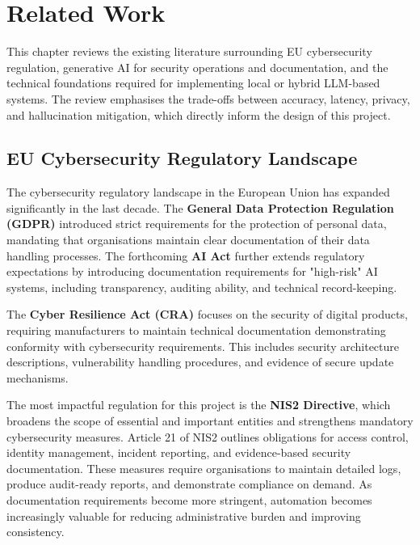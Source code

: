\documentclass[]{UCD_CS_FYP_Report}
\begin{document}
\chapter{Related Work}
\label{chp:related_work}
    This chapter reviews the existing literature surrounding EU cybersecurity regulation, generative AI for security operations and documentation, and the technical foundations required for implementing local or hybrid LLM-based systems. The review emphasises the trade-offs between accuracy, latency, privacy, and hallucination mitigation, which directly inform the design of this project.

\section{EU Cybersecurity Regulatory Landscape}
\label{sec:eu_regulatory_landscape}
        The cybersecurity regulatory landscape in the European Union has expanded significantly in the last decade. The \textbf{General Data Protection Regulation (GDPR)}\cite{GDPR2016} introduced strict requirements for the protection of personal data, mandating that organisations maintain clear documentation of their data handling processes. The forthcoming \textbf{AI Act}\cite{AIAct2024} further extends regulatory expectations by introducing documentation requirements for "high-risk" AI systems, including transparency, auditing ability, and technical record-keeping.

        The \textbf{Cyber Resilience Act (CRA)}\cite{CyberResilienceAct2024} focuses on the security of digital products, requiring manufacturers to maintain technical documentation demonstrating conformity with cybersecurity requirements. This includes security architecture descriptions, vulnerability handling procedures, and evidence of secure update mechanisms.

        The most impactful regulation for this project is the \textbf{NIS2 Directive}\cite{NIS2Directive2023}, which broadens the scope of essential and important entities and strengthens mandatory cybersecurity measures. Article 21 of NIS2 outlines obligations for access control, identity management, incident reporting, and evidence-based security documentation. These measures require organisations to maintain detailed logs, produce audit-ready reports, and demonstrate compliance on demand. As documentation requirements become more stringent, automation becomes increasingly valuable for reducing administrative burden and improving consistency.
\end{document}
